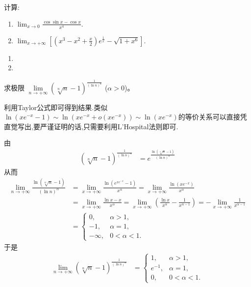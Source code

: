 \documentclass[../../main.tex]{subfiles}
\begin{document}
\begin{example}
计算:
\begin{enumerate}
\item \(
\lim_{x \to 0} \frac{\cos \sin x - \cos x}{x^4}.
\)

\item \(
\lim_{x \to +\infty} \left[\left(x^3 - x^2 + \frac{x}{2}\right) e^{\frac{1}{x}} - \sqrt{1 + x^6}\right].
\)
\end{enumerate}
\end{example}
\begin{solution}
\begin{enumerate}
\item 

\item 
\end{enumerate}
\end{solution}

\begin{example}
求极限 $\lim\limits_{n \to +\infty} (\sqrt[n]{n} - 1)^{\frac{1}{(\ln n)^{\alpha}}}$ ($\alpha > 0$)。
\end{example}
\begin{note}
利用Taylor公式即可得到结果.类似$\ln \left( xe^{-x}-1 \right) \sim \ln \left( xe^{-x}+o\left( xe^{-x} \right) \right) \sim \ln \left( xe^{-x} \right)$的等价关系可以直接凭直觉写出,要严谨证明的话,只需要利用L'Hospital法则即可.
\end{note}
\begin{solution}
由
\begin{align*}
(\sqrt[n]{n} - 1)^{\frac{1}{(\ln n)^{\alpha}}} &= e^{\frac{\ln(\sqrt[n]{n} - 1)}{(\ln n)^{\alpha}}}
\end{align*}
从而
\begin{align*}
\lim_{n \to +\infty} \frac{\ln(\sqrt[n]{n} - 1)}{(\ln n)^{\alpha}} &= \lim_{x \to +\infty} \frac{\ln(e^{x e^{-x}} - 1)}{x^{\alpha}} = \lim_{x \to +\infty} \frac{\ln(x e^{-x})}{x^{\alpha}} \\
&= \lim_{x \to +\infty} \frac{\ln x - x}{x^{\alpha}} = \lim_{x \to +\infty} \left(\frac{\ln x}{x^{\alpha}} - \frac{1}{x^{\alpha - 1}}\right) = - \lim_{x \to +\infty} \frac{1}{x^{\alpha - 1}} \\
&= \begin{cases}
0, & \alpha > 1, \\
-1, & \alpha = 1, \\
-\infty, & 0 < \alpha < 1.
\end{cases}
\end{align*}
于是
\begin{align*}
\lim_{n \to +\infty} (\sqrt[n]{n} - 1)^{\frac{1}{(\ln n)^{\alpha}}} &= \begin{cases}
1, & \alpha > 1, \\
e^{-1}, & \alpha = 1, \\
0, & 0 < \alpha < 1.
\end{cases}
\end{align*} 
\end{solution}
\end{document}
